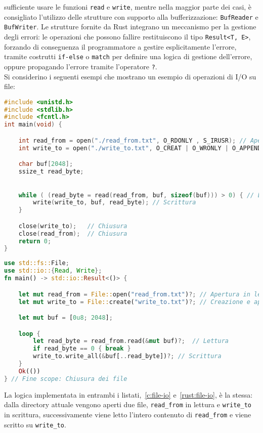 sufficiente usare le funzioni \texttt{read} e \texttt{write}, mentre nella maggior parte dei casi, è consigliato l'utilizzo delle strutture con supporto alla bufferizzazione: \texttt{BufReader} e \texttt{BufWriter}.
Le strutture fornite da Rust integrano un meccanismo per la gestione degli errori: le operazioni che possono fallire restituiscono il tipo \texttt{Result<T, E>}, forzando di conseguenza il programmatore a gestire esplicitamente
l'errore, tramite costrutti \texttt{if-else} o \texttt{match} per definire una logica di gestione dell'errore, oppure propagando l'errore tramite l'operatore \texttt{?}. \hfill
\vspace{10pt}\\
\noindent Si considerino i seguenti esempi che mostrano un esempio di operazioni di I/O su file:
\begin{lstlisting}[language=C, caption={I/O su file in C}, label={c:file-io}]
#include <unistd.h>
#include <stdlib.h>
#include <fcntl.h>
int main(void) {

    int read_from = open("./read_from.txt", O_RDONLY , S_IRUSR); // Apertura file
    int write_to = open("./write_to.txt", O_CREAT | O_WRONLY | O_APPEND , S_IWUSR); // Apertura file

    char buf[2048];
    ssize_t read_byte;

    
    while ( (read_byte = read(read_from, buf, sizeof(buf))) > 0) { // Lettura
        write(write_to, buf, read_byte); // Scrittura
    }

    close(write_to);   // Chiusura
    close(read_from);  // Chiusura
    return 0;
}
\end{lstlisting}
\begin{lstlisting}[language=Rust, caption={I/O su file in Rust}, label={rust:file-io}]
use std::fs::File;
use std::io::{Read, Write};
fn main() -> std::io::Result<()> {

    let mut read_from = File::open("read_from.txt")?; // Apertura in lettura
    let mut write_to = File::create("write_to.txt")?; // Creazione e apertura in scrittura

    let mut buf = [0u8; 2048];

    loop {
        let read_byte = read_from.read(&mut buf)?;  // Lettura
        if read_byte == 0 { break }
        write_to.write_all(&buf[..read_byte])?; // Scrittura
    }
    Ok(())
} // Fine scope: Chiusura dei file
\end{lstlisting}
La logica implementata in entrambi i listati,~\ref{c:file-io} e~\ref{rust:file-io}, è la stessa: dalla directory attuale vengono aperti due file, \texttt{read\_from} in lettura e \texttt{write\_to} in scrittura, successivamente viene letto l'intero contenuto di \texttt{read\_from} e viene scritto su \texttt{write\_to}.

